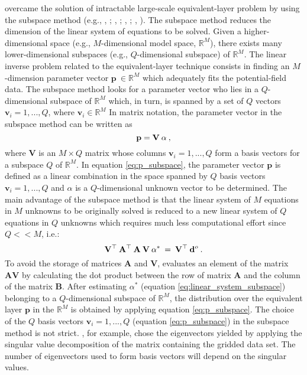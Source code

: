 \cite{mendoncca2020} overcame the solution of intractable large-scale equivalent-layer problem by using the subspace method (e.g., 
\citeauthor{skilling-bryan1984}, \citeyear{skilling-bryan1984};
\citeauthor{kennett1988}, \citeyear{kennett1988};
\citeauthor{oldenburg1993}, \citeyear{oldenburg1993};  
\citeauthor{barbosa-etal1997}, \citeyear{barbosa-etal1997}).
The subspace method  reduces the dimension of the linear system of equations to be solved. 
Given a higher-dimensional space (e.g., $M$-dimensional model space, 
$\mathbb{R}^{M}$), there exists many lower-dimensional subspaces 
(e.g., $Q$-dimensional subspace) of $\mathbb{R}^{M}$.
The linear inverse problem related to the equivalent-layer technique 
consists in finding an $M$-dimension parameter vector $\mathbf{p} \: \in \mathbb{R}^{M}$ which adequately fits the potential-field data.
The subspace method looks for a parameter vector who lies in a $Q$-dimensional subspace of $\mathbb{R}^{M}$ which, in turn, is spanned by a set of $Q$ vectors 
$\mathbf{v}_i = 1, ..., Q$, where $\mathbf{v}_i \in \mathbb{R}^{M}$
In matrix notation,  the parameter vector in the subspace method 
can be written as  
\begin{equation}
	\mathbf{p} = \mathbf{V} \: \boldmath{\alpha}  \:,
	\label{eq:p_subspace}
\end{equation}
where $\mathbf{V}$ is an $M \times Q$ matrix whose columns 
$\mathbf{v}_i = 1, ..., Q$ form a basis vectors for a subspace $Q$ of 
$\mathbb{R}^{M}$.
In equation \ref{eq:p_subspace}, the parameter vector $\mathbf{p}$ 
is defined as a linear combination in the space spanned by $Q$ basis vectors 
$\mathbf{v}_i = 1, ..., Q$  and {\boldmath$\alpha$}  is a $Q$-dimensional 
unknown vector to be determined.
The main advantage of the subspace method is that the linear system of 
$M$ equations in $M$ unknowns to be originally solved 
is reduced to a new linear system of $Q$ equations in $Q$ unknowns
which requires much less computational effort since $Q << M$, i.e.:
\begin{equation}
	 \mathbf{V}^{\top} \:  \mathbf{A}^{\top} \: \mathbf{A} \:  \mathbf{V}  \: \boldmath{\alpha}^{\ast} \: = \:
	 \mathbf{V}^{\top}  \: \mathbf{d}^{o} \:.
	\label{eq:linear_system_subspace}
\end{equation}
To avoid the storage of matrices $\mathbf{A}$ and $\mathbf{V}$,  \cite{mendoncca2020} 
evaluates an element of the matrix  $\mathbf{A} \mathbf{V}$ by
calculating the dot product between the row of matrix $\mathbf{A}$ and the column of the matrix 
$\mathbf{B}$. 
After estimating {\boldmath$\alpha^{\ast}$} (equation \ref{eq:linear_system_subspace}) 
belonging to a $Q$-dimensional subspace of $\mathbb{R}^{M}$,
the distribution over the equivalent layer  $\mathbf{p}$ in the $\mathbb{R}^{M}$ is obtained by applying equation \ref{eq:p_subspace}.
The choice of the $Q$ basis vectors $\mathbf{v}_i = 1, ..., Q$ 
(equation \ref{eq:p_subspace}) in the subspace method is not strict.
\cite{mendoncca2020}, for example, chose the eigenvectors yielded by 
applying the singular value decomposition of the matrix containing the gridded data set.
The number of eigenvectors used to form basis vectors will depend on 
the singular values. 

